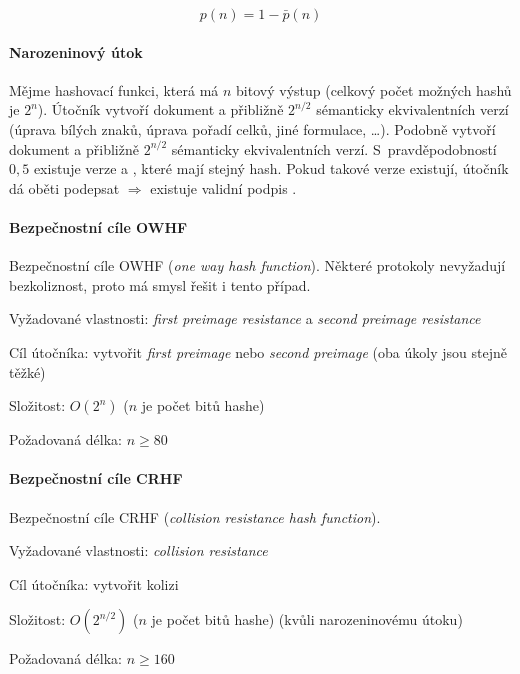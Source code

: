 \begin{equation}
    p(n) = 1 - \bar p(n)
\end{equation}

\paragraph*{Narozeninový útok} Mějme hashovací funkci, která má $n$ bitový výstup (celkový počet možných hashů je $2^{n}$). Útočník vytvoří dokument  a přibližně $2^{n/2}$ sémanticky ekvivalentních verzí (úprava bílých znaků, úprava pořadí celků, jiné formulace, \dots). Podobně vytvoří dokument  a přibližně $2^{n/2}$ sémanticky ekvivalentních verzí. S~pravděpodobností $0,5$ existuje verze  a , které mají stejný hash. Pokud takové verze existují, útočník dá oběti podepsat  $\Rightarrow$ existuje validní podpis .

\paragraph*{Bezpečnostní cíle OWHF} Bezpečnostní cíle OWHF (\textit{one way hash function}). Některé protokoly nevyžadují bezkoliznost, proto má smysl řešit i tento případ. \begin{compactitem}
    \item Vyžadované vlastnosti: \textit{first preimage resistance} a \textit{second preimage resistance}
    \item Cíl útočníka: vytvořit \textit{first preimage} nebo \textit{second preimage} (oba úkoly jsou stejně těžké)
    \item Složitost: $O(2^n)$ ($n$ je počet bitů hashe)
    \item Požadovaná délka: $n \geq 80$
\end{compactitem}

\paragraph*{Bezpečnostní cíle CRHF} Bezpečnostní cíle CRHF (\textit{collision resistance hash function}). \begin{compactitem}
    \item Vyžadované vlastnosti: \textit{collision resistance}
    \item Cíl útočníka: vytvořit kolizi
    \item Složitost: $O(2^{n / 2})$ ($n$ je počet bitů hashe) (kvůli narozeninovému útoku)
    \item Požadovaná délka: $n \geq 160$
\end{compactitem}

